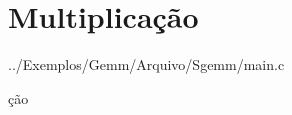 \hypertarget{_multiplica_xC3_xA7_xC3_xA3o-example}{}\section{Multiplicação}
../\+Exemplos/\+Gemm/\+Arquivo/\+Sgemm/main.c


\begin{DoxyCodeInclude}
\end{DoxyCodeInclude}
ção 